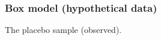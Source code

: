\documentclass[handout]{beamer}
\begin{document}


   \begin{frame}
   \frametitle{Box model (hypothetical data)}
   \begin{center}
   \end{center}
   The placebo sample (observed).
   \end{frame}
\end{document}
